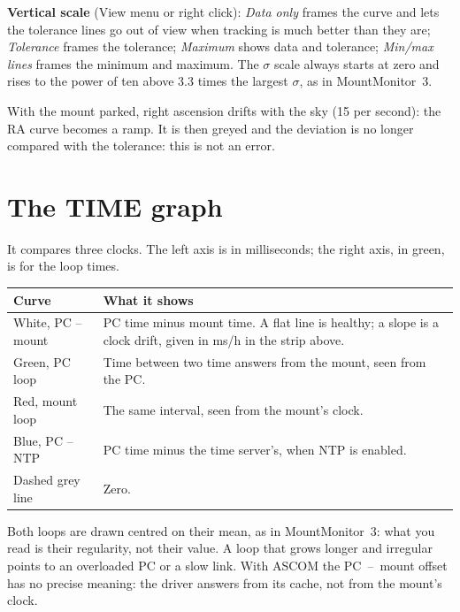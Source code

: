 \textbf{Vertical scale} (View menu or right click): \emph{Data only} frames
the curve and lets the tolerance lines go out of view when tracking is much
better than they are; \emph{Tolerance} frames the tolerance; \emph{Maximum}
shows data and tolerance; \emph{Min/max lines} frames the minimum and maximum.
The $\sigma$ scale always starts at zero and rises to the power of ten above
3.3 times the largest $\sigma$, as in MountMonitor~3.

\begin{tip}
With the mount parked, right ascension drifts with the sky (15\arcsec{} per
second): the RA curve becomes a ramp. It is then greyed and the deviation is no
longer compared with the tolerance: this is not an error.
\end{tip}

\section{The TIME graph}
\label{sec:time}

It compares three clocks. The left axis is in milliseconds; the right axis, in
green, is for the loop times.

\begin{center}
\begin{tabularx}{\textwidth}{lX}
\toprule
\textbf{Curve} & \textbf{What it shows} \\
\midrule
White, PC -- mount & PC time minus mount time. A flat line is healthy; a slope
is a clock drift, given in ms/h in the strip above. \\
Green, PC loop & Time between two time answers from the mount, seen from the
PC. \\
Red, mount loop & The same interval, seen from the mount's clock. \\
Blue, PC -- NTP & PC time minus the time server's, when NTP is enabled. \\
Dashed grey line & Zero. \\
\bottomrule
\end{tabularx}
\end{center}

Both loops are drawn centred on their mean, as in MountMonitor~3: what you read
is their regularity, not their value. A loop that grows longer and irregular
points to an overloaded PC or a slow link. With ASCOM the PC~--~mount offset
has no precise meaning: the driver answers from its cache, not from the
mount's clock.

